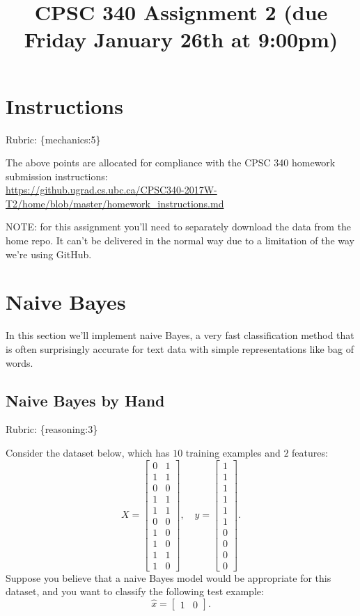 \documentclass{article}
\def\blu#1{{\color{blu}#1}}
\def\gre#1{{\color{gre}#1}}
\def\rubric#1{\gre{Rubric: \{#1\}}}{}
\begin{document}
\title{CPSC 340 Assignment 2 (due Friday January 26th at 9:00pm)}
\author{}
\date{}
\maketitle
\vspace{-4em}

\section*{Instructions}
\rubric{mechanics:5}

The above points are allocated for compliance with the CPSC 340 homework submission instructions:\\
\url{https://github.ugrad.cs.ubc.ca/CPSC340-2017W-T2/home/blob/master/homework_instructions.md}

\blu{NOTE: for this assignment you'll need to separately download the data from the home repo.
It can't be delivered in the normal way due to a limitation of the way we're using GitHub.}

\section{Naive Bayes}

In this section we'll implement naive Bayes, a very fast classification method that is often surprisingly accurate for text data with simple representations like bag of words.



\subsection{Naive Bayes by Hand}
\rubric{reasoning:3}

Consider the dataset below, which has $10$ training examples and $2$ features:
\[
X = \begin{bmatrix}0 & 1\\1 & 1\\ 0 & 0\\ 1 & 1\\ 1 & 1\\ 0 & 0\\  1 & 0\\  1 & 0\\  1 & 1\\  1 &0\end{bmatrix}, \quad y = \begin{bmatrix}1\\1\\1\\1\\1\\1\\0\\0\\0\\0\end{bmatrix}.
\]
Suppose you believe that a naive Bayes model would be appropriate for this dataset, and you want to classify the following test example:
\[
\hat{x} = \begin{bmatrix}1 & 0\end{bmatrix}.
\]
\end{document}
